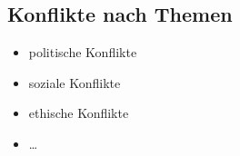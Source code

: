 \subsection{Konflikte nach Themen}

\begin{itemize}
  \item politische Konflikte
  \item soziale Konflikte
  \item ethische Konflikte
  \item \ldots
\end{itemize}
